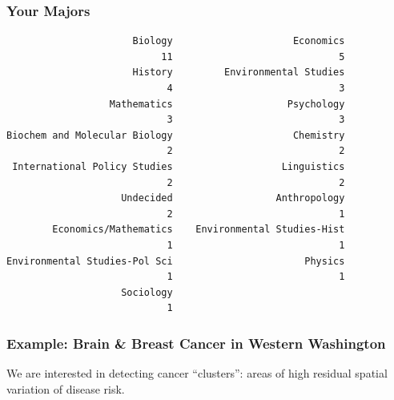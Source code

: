\documentclass[handout]{beamer}
\begin{document}
\begin{frame}[fragile]
\frametitle{Your Majors}
\begin{small}
\begin{verbatim}
                      Biology                     Economics 
                           11                             5 
                      History         Environmental Studies 
                            4                             3 
                  Mathematics                    Psychology 
                            3                             3 
Biochem and Molecular Biology                     Chemistry 
                            2                             2 
 International Policy Studies                   Linguistics 
                            2                             2 
                    Undecided                  Anthropology 
                            2                             1 
        Economics/Mathematics    Environmental Studies-Hist 
                            1                             1 
Environmental Studies-Pol Sci                       Physics 
                            1                             1 
                    Sociology 
                            1 
\end{verbatim}
\end{small}
\end{frame}


\begin{frame}[fragile]
\frametitle{Example: Brain \& Breast Cancer in Western Washington}

We are interested in detecting cancer ``clusters'':  areas of high residual spatial variation of disease risk.  

\end{frame}
\end{document}
